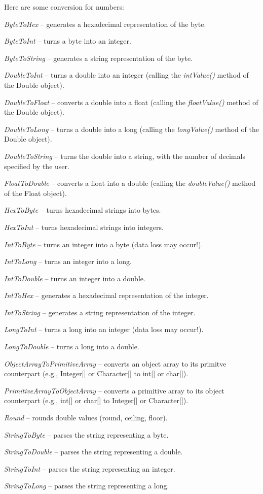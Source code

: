 Here are some conversion for numbers:
\begin{tight_itemize}
	\item \textit{ByteToHex} -- generates a hexadecimal representation of the byte.
	\item \textit{ByteToInt} -- turns a byte into an integer.
	\item \textit{ByteToString} -- generates a string representation of the byte.
	\item \textit{DoubleToInt} -- turns a double into an integer (calling the
	\textit{intValue()} method of the Double object).
	\item \textit{DoubleToFloat} -- converts a double into a float (calling the 
	\textit{floatValue()} method of the Double object).
	\item \textit{DoubleToLong} -- turns a double into a long (calling the
	\textit{longValue()} method of the Double object).
	\item \textit{DoubleToString} -- turns the double into a string, with the number
	of decimals specified by the user.
	\item \textit{FloatToDouble} -- converts a float into a double (calling the 
	\textit{doubleValue()} method of the Float object).
	\item \textit{HexToByte} -- turns hexadecimal strings into bytes.
	\item \textit{HexToInt} -- turns hexadecimal strings into integers.
	\item \textit{IntToByte} -- turns an integer into a byte (data loss may occur!).
	\item \textit{IntToLong} -- turns an integer into a long.
	\item \textit{IntToDouble} -- turns an integer into a double.
	\item \textit{IntToHex} -- generates a hexadecimal representation of the integer.
	\item \textit{IntToString} -- generates a string representation of the integer.
	\item \textit{LongToInt} -- turns a long into an integer (data loss may occur!).
	\item \textit{LongToDouble} -- turns a long into a double.
	\item \textit{ObjectArrayToPrimitiveArray} -- converts an object array to 
	its primitve counterpart (e.g., Integer[] or Character[] to int[] or char[]).
	\item \textit{PrimitiveArrayToObjectArray} -- converts a primitive array to
	its object counterpart (e.g., int[] or char[] to Integer[] or Character[]).
	\item \textit{Round} -- rounds double values (round, ceiling, floor).
	\item \textit{StringToByte} -- parses the string representing a byte.
	\item \textit{StringToDouble} -- parses the string representing a double.
	\item \textit{StringToInt} -- parses the string representing an integer.
	\item \textit{StringToLong} -- parses the string representing a long.
\end{tight_itemize}
